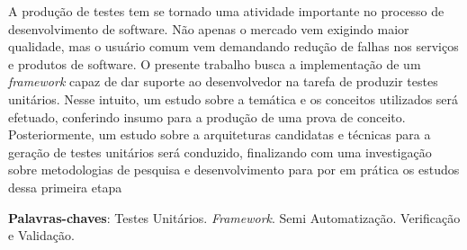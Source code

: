 \begin{resumo}
A produção de testes tem se tornado uma atividade importante no processo de desenvolvimento de software. Não apenas o mercado vem exigindo maior qualidade, mas o usuário comum vem demandando redução de falhas nos serviços e produtos de software. O presente trabalho busca a implementação de um \textit{framework} capaz de dar suporte ao desenvolvedor na tarefa de produzir testes unitários. Nesse intuito, um estudo sobre a temática e os conceitos utilizados será efetuado, conferindo insumo para a produção de uma prova de conceito. Posteriormente, um estudo sobre a arquiteturas candidatas e técnicas para a geração de testes unitários será conduzido, finalizando com uma investigação sobre metodologias de pesquisa e desenvolvimento para por em prática os estudos dessa primeira etapa

\vspace{\onelineskip}
    
\noindent
\textbf{Palavras-chaves}: Testes Unitários. \textit{Framework}. Semi Automatização. Verificação e Validação.
\end{resumo}
